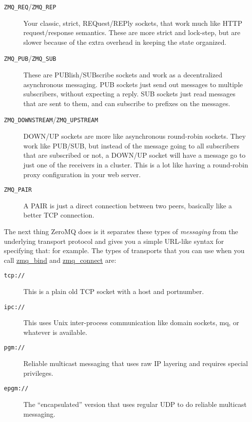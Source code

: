 \begin{description}
  \item [\texttt{ZMQ\_REQ}/\texttt{ZMQ\_REP}]  Your classic, strict, REQuest/REPly sockets, that work much like
    HTTP request/response semantics.  These are more strict and lock-step, but are slower
    because of the extra overhead in keeping the state organized.
  \item [\texttt{ZMQ\_PUB}/\texttt{ZMQ\_SUB}]  These are PUBlish/SUBscribe sockets and work as a decentralized
    asynchronous messaging.  PUB sockets just send out messages to multiple subscribers, without
    expecting a reply.  SUB sockets just read messages that are sent to them, and can subscribe
    to prefixes on the messages.
  \item [\texttt{ZMQ\_DOWNSTREAM}/\texttt{ZMQ\_UPSTREAM}] DOWN/UP sockets are more like asynchronous round-robin
    sockets.  They work like PUB/SUB, but instead of the message going to all subscribers that
    are subscribed or not, a DOWN/UP socket will have a message go to just one of the receivers
    in a cluster.  This is a lot like having a round-robin proxy configuration in your web server.
  \item [\texttt{ZMQ\_PAIR}] A PAIR is just a direct connection between two peers, basically like a better
    TCP connection.
\end{description}

The next thing ZeroMQ does is it separates these types of \emph{messaging} from the underlying
transport protocol and gives you a simple URL-like syntax for specifying that: 
for example.  The types of transports that you can use when you call \href{http://api.zeromq.org/zmq\_bind.html}{zmq\_bind}
and \href{http://api.zeromq.org/zmq\_connect.html}{zmq\_connect} are:

\begin{description}
\item [\texttt{tcp://}] This is a plain old TCP socket with a host and portnumber.
\item [\texttt{ipc://}] This uses Unix inter-process communication like domain sockets, mq, or whatever is available.
\item [\texttt{pgm://}] Reliable multicast messaging that uses raw IP layering and requires special privileges.
\item [\texttt{epgm://}] The ``encapsulated'' version that uses regular UDP to do reliable multicast messaging.
\end{description}

